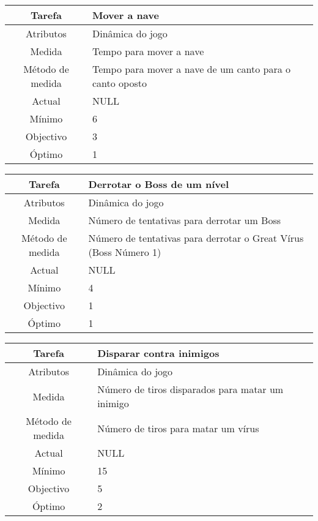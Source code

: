 \begin{center}
	\begin{tabular} {|c|p{10cm}|}
		\hline
		Tarefa & Mover a nave \\
		\hline
		Atributos & Dinâmica do jogo \\
		\hline
		Medida & Tempo para mover a nave \\
		\hline
		Método de medida & Tempo para mover a nave de um canto para o canto oposto \\
		\hline
		Actual & NULL \\
		Mínimo & 6 \\
		Objectivo & 3 \\
		Óptimo & 1 \\
		\hline
	\end{tabular}
\end{center}

\begin{center}
	\begin{tabular} {|c|p{10cm}|}
		\hline
		Tarefa & Derrotar o Boss de um nível \\
		\hline
		Atributos & Dinâmica do jogo \\
		\hline
		Medida & Número de tentativas para derrotar um Boss \\
		\hline
		Método de medida & Número de tentativas para derrotar o Great Vírus (Boss Número 1) \\
		\hline
		Actual & NULL \\
		Mínimo & 4 \\
		Objectivo & 1 \\
		Óptimo & 1 \\
		\hline
	\end{tabular}
\end{center}

\begin{center}
	\begin{tabular} {|c|p{10cm}|}
		\hline
		Tarefa & Disparar contra inimigos \\
		\hline
		Atributos & Dinâmica do jogo \\
		\hline
		Medida & Número de tiros disparados para matar um inimigo \\
		\hline
		Método de medida & Número de tiros para matar um vírus \\
		\hline
		Actual & NULL \\
		Mínimo & 15 \\
		Objectivo & 5 \\
		Óptimo & 2 \\
		\hline
	\end{tabular}
\end{center}





